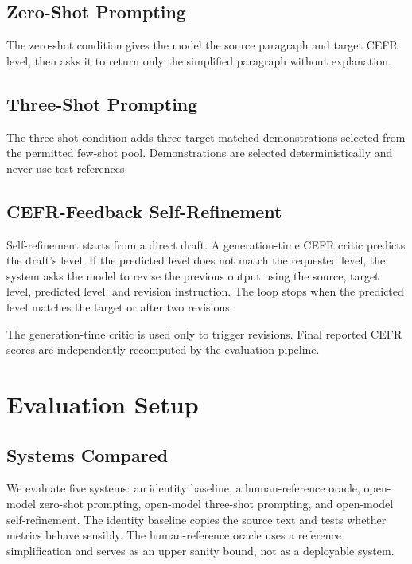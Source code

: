 \documentclass[11pt]{article}
\begin{document}
\subsection{Zero-Shot Prompting}

The zero-shot condition gives the model the source paragraph and target CEFR level, then asks it to return only the simplified paragraph without explanation.

\subsection{Three-Shot Prompting}

The three-shot condition adds three target-matched demonstrations selected from the permitted few-shot pool. Demonstrations are selected deterministically and never use test references.

\subsection{CEFR-Feedback Self-Refinement}

Self-refinement starts from a direct draft. A generation-time CEFR critic predicts the draft's level. If the predicted level does not match the requested level, the system asks the model to revise the previous output using the source, target level, predicted level, and revision instruction. The loop stops when the predicted level matches the target or after two revisions.

The generation-time critic is used only to trigger revisions. Final reported CEFR scores are independently recomputed by the evaluation pipeline.

\section{Evaluation Setup}

\subsection{Systems Compared}

We evaluate five systems: an identity baseline, a human-reference oracle, open-model zero-shot prompting, open-model three-shot prompting, and open-model self-refinement. The identity baseline copies the source text and tests whether metrics behave sensibly. The human-reference oracle uses a reference simplification and serves as an upper sanity bound, not as a deployable system.
\end{document}
